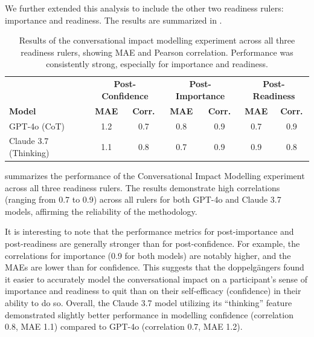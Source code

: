 We further extended this analysis to include the other two readiness rulers: importance and readiness. The results are summarized in .




\begin{table}[!ht]
	\centering
	\begin{tabular}{l|cc|cc|cc}
		\toprule
		                      & \multicolumn{2}{c|}{\textbf{Post-Confidence}} & \multicolumn{2}{c|}{\textbf{Post-Importance}} & \multicolumn{2}{c}{\textbf{Post-Readiness}}                                                  \\
		\textbf{Model}        & \textbf{MAE}                                  & \textbf{Corr.}                                & \textbf{MAE}                                & \textbf{Corr.} & \textbf{MAE} & \textbf{Corr.} \\
		\midrule
		GPT-4o (CoT)          & 1.2                                           & 0.7                                           & 0.8                                         & 0.9            & 0.7          & 0.9            \\
		Claude 3.7 (Thinking) & 1.1                                           & 0.8                                           & 0.7                                         & 0.9            & 0.9          & 0.8            \\ \hline
	\end{tabular}
	\caption[Multi-ruler conversational impact modelling results]{Results of the conversational impact modelling experiment across all three readiness rulers, showing MAE and Pearson correlation. Performance was consistently strong, especially for importance and readiness.}
	\label{tab:autoplay_results_full}
\end{table}

 summarizes the performance of the Conversational Impact Modelling experiment across all three readiness rulers. The results demonstrate high correlations (ranging from 0.7 to 0.9) across all rulers for both GPT-4o and Claude 3.7 models, affirming the reliability of the methodology.

It is interesting to note that the performance metrics for post-importance and post-readiness are generally stronger than for post-confidence. For example, the correlations for importance (0.9 for both models) are notably higher, and the MAEs are lower than for confidence. This suggests that the doppelgängers found it easier to accurately model the conversational impact on a participant's sense of importance and readiness to quit than on their self-efficacy (confidence) in their ability to do so. Overall, the Claude 3.7 model utilizing its ``thinking'' feature demonstrated slightly better performance in modelling confidence (correlation 0.8, MAE 1.1) compared to GPT-4o (correlation 0.7, MAE 1.2).




